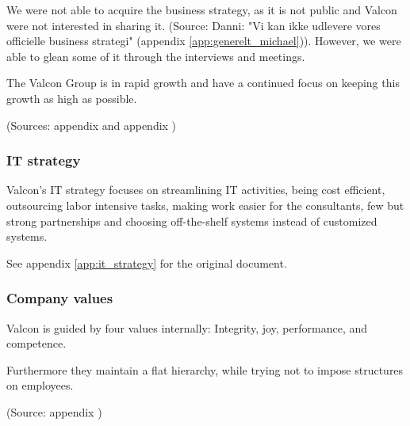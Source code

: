 We were not able to acquire the business strategy, as it is not public and Valcon were not interested in sharing it. (Source: Danni: "Vi kan ikke udlevere vores officielle business strategi" (appendix \ref{app:generelt_michael})). 
However, we were able to glean some of it through the interviews and meetings.

The Valcon Group is in rapid growth and have a continued focus on keeping this growth as high as possible. 

(Sources: appendix  and appendix )

\subsubsection{IT strategy}
Valcon's IT strategy focuses on streamlining IT activities, being cost efficient, outsourcing labor intensive tasks, making work easier for the consultants, few but strong partnerships and choosing off-the-shelf systems instead of customized systems.

See appendix \ref{app:it_strategy} for the original document. 

\subsubsection{Company values}
Valcon is guided by four values internally: Integrity, joy, performance, and competence.

Furthermore they maintain a flat hierarchy, while trying not to impose structures on employees. 

(Source: appendix )